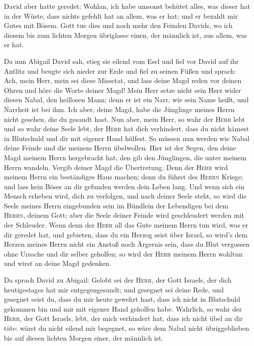  David aber hatte geredet: Wohlan, ich habe umsonst
behütet alles, was dieser hat in der Wüste, dass nichts gefehlt hat an
allem, was er hat; und er bezahlt mir Gutes mit Bösem. 
Gott tue dies und noch mehr den Feinden Davids, wo ich diesem bis zum
lichten Morgen übriglasse einen, der männlich ist, aus allem, was er
hat.

 Da nun Abigail David sah, stieg sie eilend vom Esel und
fiel vor David auf ihr Antlitz und beugte sich nieder zur Erde
 und fiel zu seinen Füßen und sprach: Ach, mein Herr,
mein sei diese Missetat, und lass deine Magd reden vor deinen Ohren und
höre die Worte deiner Magd!  Mein Herr setze nicht sein
Herz wider diesen Nabal, den heillosen Mann; denn er ist ein Narr, wie
sein Name heißt, und Narrheit ist bei ihm. Ich aber, deine Magd, habe
die Jünglinge meines Herrn nicht gesehen, die du gesandt hast.
 Nun aber, mein Herr, so wahr der \textsc{Herr} lebt und
so wahr deine Seele lebt, der \textsc{Herr} hat dich verhindert, dass du
nicht kämest in Blutschuld und dir mit eigener Hand hülfest. So müssen
nun werden wie Nabal deine Feinde und die meinem Herrn übelwollen.
 Hier ist der Segen, den deine Magd meinem Herrn
hergebracht hat; den gib den Jünglingen, die unter meinem Herrn wandeln.
 Vergib deiner Magd die Übertretung. Denn der
\textsc{Herr} wird meinem Herrn ein beständiges Haus machen; denn du
führst des \textsc{Herrn} Kriege; und lass kein Böses an dir gefunden
werden dein Leben lang.  Und wenn sich ein Mensch erheben
wird, dich zu verfolgen, und nach deiner Seele steht, so wird die Seele
meines Herrn eingebunden sein im Bündlein der Lebendigen bei dem
\textsc{Herrn}, deinem Gott; aber die Seele deiner Feinde wird
geschleudert werden mit der Schleuder.  Wenn denn der
\textsc{Herr} all das Gute meinem Herrn tun wird, was er dir geredet
hat, und gebieten, dass du ein Herzog seist über Israel, 
so wird's dem Herzen meines Herrn nicht ein Anstoß noch Ärgernis sein,
dass du Blut vergossen ohne Ursache und dir selber geholfen; so wird der
\textsc{Herr} meinem Herrn wohltun und wirst an deine Magd gedenken.

 Da sprach David zu Abigail: Gelobt sei der
\textsc{Herr}, der Gott Israels, der dich heutigestages hat mir
entgegengesandt;  und gesegnet sei deine Rede, und
gesegnet seist du, dass du mir heute gewehrt hast, dass ich nicht in
Blutschuld gekommen bin und mir mit eigener Hand geholfen habe.
 Wahrlich, so wahr der \textsc{Herr}, der Gott Israels,
lebt, der mich verhindert hat, dass ich nicht übel an dir täte: wärst du
nicht eilend mir begegnet, so wäre dem Nabal nicht übriggeblieben bis
auf diesen lichten Morgen einer, der männlich ist.


